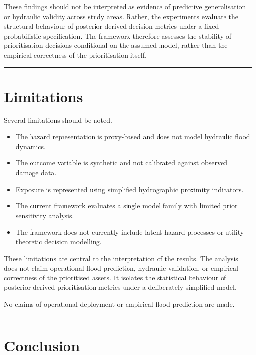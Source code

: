 \documentclass[
]{article}
\providecommand{\tightlist}{%
  \setlength{\itemsep}{0pt}\setlength{\parskip}{0pt}}
\begin{document}
These findings should not be interpreted as evidence of predictive
generalisation or hydraulic validity across study areas. Rather, the
experiments evaluate the structural behaviour of posterior-derived
decision metrics under a fixed probabilistic specification. The
framework therefore assesses the stability of prioritisation decisions
conditional on the assumed model, rather than the empirical correctness
of the prioritisation itself.

\begin{center}\rule{0.5\linewidth}{0.5pt}\end{center}

\section{Limitations}\label{limitations}

Several limitations should be noted.

\begin{itemize}
\tightlist
\item
  The hazard representation is proxy-based and does not model hydraulic
  flood dynamics.
\item
  The outcome variable is synthetic and not calibrated against observed
  damage data.
\item
  Exposure is represented using simplified hydrographic proximity
  indicators.
\item
  The current framework evaluates a single model family with limited
  prior sensitivity analysis.
\item
  The framework does not currently include latent hazard processes or
  utility-theoretic decision modelling.
\end{itemize}

These limitations are central to the interpretation of the results. The
analysis does not claim operational flood prediction, hydraulic
validation, or empirical correctness of the prioritised assets. It
isolates the statistical behaviour of posterior-derived prioritisation
metrics under a deliberately simplified model.

No claims of operational deployment or empirical flood prediction are
made.

\begin{center}\rule{0.5\linewidth}{0.5pt}\end{center}

\section{Conclusion}\label{conclusion}
\end{document}

